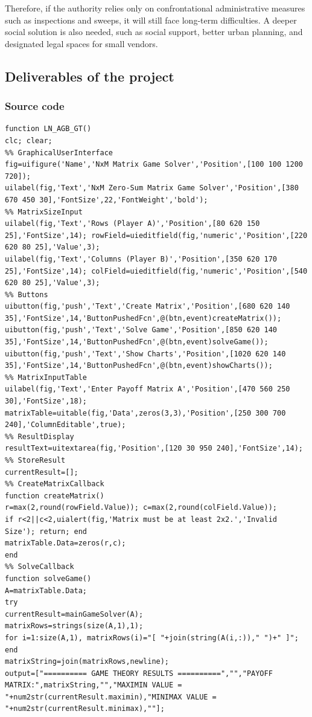 \documentclass[12pt,a4paper]{article}
\begin{document}
Therefore, if the authority relies only on confrontational administrative measures such as inspections and sweeps, it will still face long-term difficulties. A deeper social solution is also needed, such as social support, better urban planning, and designated legal spaces for small vendors.

\subsection{Deliverables of the project}
\subsubsection{Source code}
\begin{lstlisting}[style=code]
function LN_AGB_GT()
clc; clear;
%% GraphicalUserInterface
fig=uifigure('Name','NxM Matrix Game Solver','Position',[100 100 1200 720]);
uilabel(fig,'Text','NxM Zero-Sum Matrix Game Solver','Position',[380 670 450 30],'FontSize',22,'FontWeight','bold');
%% MatrixSizeInput
uilabel(fig,'Text','Rows (Player A)','Position',[80 620 150 25],'FontSize',14); rowField=uieditfield(fig,'numeric','Position',[220 620 80 25],'Value',3);
uilabel(fig,'Text','Columns (Player B)','Position',[350 620 170 25],'FontSize',14); colField=uieditfield(fig,'numeric','Position',[540 620 80 25],'Value',3);
%% Buttons
uibutton(fig,'push','Text','Create Matrix','Position',[680 620 140 35],'FontSize',14,'ButtonPushedFcn',@(btn,event)createMatrix());
uibutton(fig,'push','Text','Solve Game','Position',[850 620 140 35],'FontSize',14,'ButtonPushedFcn',@(btn,event)solveGame());
uibutton(fig,'push','Text','Show Charts','Position',[1020 620 140 35],'FontSize',14,'ButtonPushedFcn',@(btn,event)showCharts());
%% MatrixInputTable
uilabel(fig,'Text','Enter Payoff Matrix A','Position',[470 560 250 30],'FontSize',18);
matrixTable=uitable(fig,'Data',zeros(3,3),'Position',[250 300 700 240],'ColumnEditable',true);
%% ResultDisplay
resultText=uitextarea(fig,'Position',[120 30 950 240],'FontSize',14);
%% StoreResult
currentResult=[];
%% CreateMatrixCallback
function createMatrix()
r=max(2,round(rowField.Value)); c=max(2,round(colField.Value));
if r<2||c<2,uialert(fig,'Matrix must be at least 2x2.','Invalid Size'); return; end
matrixTable.Data=zeros(r,c);
end
%% SolveCallback
function solveGame()
A=matrixTable.Data;
try
currentResult=mainGameSolver(A);
matrixRows=strings(size(A,1),1);
for i=1:size(A,1), matrixRows(i)="[ "+join(string(A(i,:))," ")+" ]"; end
matrixString=join(matrixRows,newline);
output=["========== GAME THEORY RESULTS ==========","","PAYOFF MATRIX:",matrixString,"","MAXIMIN VALUE = "+num2str(currentResult.maximin),"MINIMAX VALUE = "+num2str(currentResult.minimax),""];

\end{lstlisting}
\end{document}

